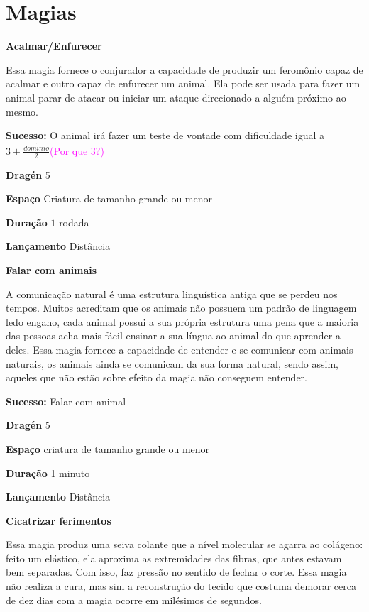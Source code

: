 \section{Magias}
\label{sec:magias}
\textbf{Acalmar/Enfurecer}

Essa  magia  fornece  o  conjurador  a  capacidade  de  produzir  um  feromônio  capaz  de  acalmar  e  outro  
capaz  de  enfurecer  um  animal.  Ela  pode  ser  usada  para  fazer  um  animal  parar  de  atacar  ou  iniciar  
um  ataque  direcionado  a  alguém  próximo  ao  mesmo.    

\textbf{Sucesso:} O animal irá fazer um teste de vontade com dificuldade igual a $3 + \frac{dom\acute{i}nio}{2}$\textcolor{magenta}{(Por que 3?)}

\textbf{Dragén} 5

\textbf{Espaço} Criatura de tamanho grande ou menor

\textbf{Duração} $1$ rodada

\textbf{Lançamento} Distância
\bigskip

\textbf{Falar  com  animais}  

A  comunicação  natural  é  uma  estrutura  linguística  antiga  que  se  perdeu  nos  tempos.  Muitos  
acreditam  que  os  animais  não  possuem  um  padrão  de  linguagem
ledo  engano,  cada  animal  possui  a  sua  própria  estrutura  uma  pena  que  a  maioria  das  pessoas  
acha  mais  fácil  ensinar  a  sua  língua  ao  
animal  do  que  aprender  a  deles.  Essa  magia  fornece  a  capacidade  de  entender  e  se  comunicar  com  
animais  naturais,  os  animais  ainda  se  comunicam  da  sua  forma  natural,  sendo  assim,  aqueles  que  não  
estão  sobre  efeito  da  magia  não  conseguem  entender.  

\textbf{Sucesso:} Falar com animal

\textbf{Dragén} 5

\textbf{Espaço} criatura de tamanho grande ou menor

\textbf{Duração} 1 minuto

\textbf{Lançamento} Distância
\bigskip

\textbf{Cicatrizar  ferimentos}

Essa  magia  produz  uma  seiva  colante  que  a  nível  molecular  se  agarra  ao  colágeno:  feito  um  elástico,  
ela  aproxima  as  extremidades  das  fibras,  que  antes  estavam  bem  separadas.  Com  isso,  faz  pressão  no  
sentido  de  fechar  o  corte.  Essa  magia  não  realiza  a  cura,  mas  sim  a  reconstrução  do  tecido  que  
costuma  demorar  cerca  de  dez  dias  com  a  magia  ocorre  em  milésimos  de  segundos.  

